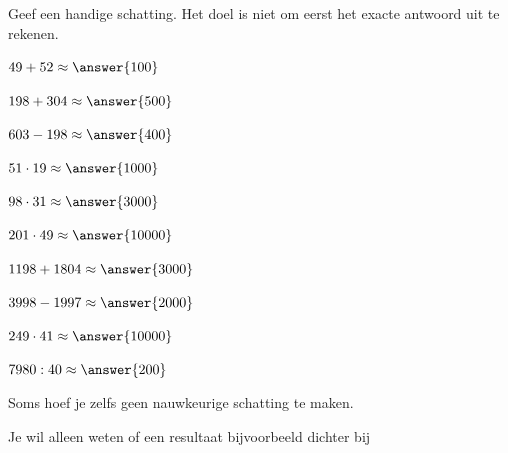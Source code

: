 \documentclass{ximera}
\begin{document}
\begin{oefening}{\oefB\ESS}

Geef een handige schatting. Het doel is niet om eerst het exacte antwoord uit
te rekenen.

\begin{question} \(49+52\approx\answer{100}\) \end{question}

\begin{question} \(198+304\approx\answer{500}\) \end{question}

\begin{question} \(603-198\approx\answer{400}\) \end{question}

\begin{question} \(51\cdot19\approx\answer{1000}\) \end{question}

\begin{question} \(98\cdot31\approx\answer{3000}\) \end{question}

\begin{question} \(201\cdot49\approx\answer{10000}\) \end{question}

\begin{question} \(1198+1804\approx\answer{3000}\) \end{question}

\begin{question} \(3998-1997\approx\answer{2000}\) \end{question}

\begin{question} \(249\cdot41\approx\answer{10000}\) \end{question}

\begin{question} \(7980:40\approx\answer{200}\) \end{question}

\end{oefening}




Soms hoef je zelfs geen nauwkeurige schatting te maken.

Je wil alleen weten of een resultaat bijvoorbeeld dichter bij
\end{document}
